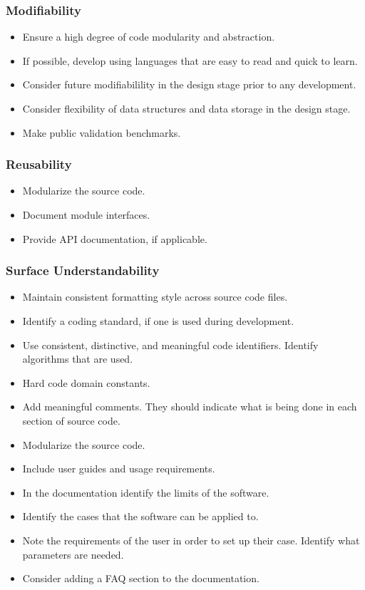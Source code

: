 \documentclass[12pt, notitlepage]{article}
\begin{document}
\subsubsection{Modifiability}

\begin{itemize}
	\item Ensure a high degree of code modularity and abstraction.
	\item If possible, develop using languages that are easy to read and quick to learn.
	\item Consider future modifiabilility in the design stage prior to any development.
	\item Consider flexibility of data structures and data storage in the design stage.
	\item Make public validation benchmarks.
\end{itemize}

\subsubsection{Reusability}

\begin{itemize}
	\item Modularize the source code.
	\item Document module interfaces.
	\item Provide API documentation, if applicable.
\end{itemize}

\subsubsection{Surface Understandability}

\begin{itemize}
	\item Maintain consistent formatting style across source code files.
	\item Identify a coding standard, if one is used during development.
	\item Use consistent, distinctive, and meaningful code identifiers. Identify algorithms that are used.
	\item Hard code domain constants.
	\item Add meaningful comments. They should indicate what is being done in each section of source code.
	\item Modularize the source code.
	\item Include user guides and usage requirements.
	\item In the documentation identify the limits of the software. 
	\item Identify the cases that the software can be applied to.
	\item Note the requirements of the user in order to set up their case. Identify what parameters are needed. 
	\item Consider adding a FAQ section to the documentation. 
\end{itemize}
\end{document}
